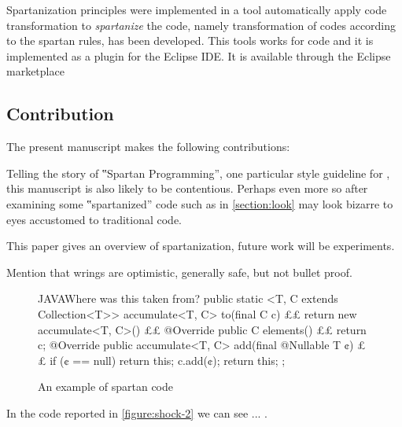 Spartanization principles were implemented in a tool automatically apply code
transformation to \emph{spartanize} the code, namely transformation of codes
according to the spartan rules, has been developed.
This tools works for \Java code and it is implemented as a plugin for the
Eclipse IDE\@. It is available through the Eclipse
marketplace



\subsection{Contribution}

The present manuscript makes the following contributions:

Telling the story of ‟Spartan Programming”, one particular style guideline for
\Java, this manuscript is also likely to be contentious. Perhaps even more so
after examining some ‟spartanized” code such as in \cref{section:look}
may look bizarre to eyes accustomed to traditional \Java code.


This paper gives an overview of spartanization, future work will be
experiments.

Mention that wrings are optimistic, generally safe, but not bullet proof.

\begin{figure}
\label{figure:first}
\caption{An example of spartan code}
\begin{Code}{JAVA}{Where was this taken from?}
public static <T, C extends Collection<T>> accumulate<T, C>
to(final C c) {££
return new accumulate<T, C>() {££
@Override public C elements() {££
return c;
}
@Override public accumulate<T, C>
add(final @Nullable T ¢) {££
if (¢ == null)
return this;
c.add(¢);
return this;
}
};
}
\end{Code}
\end{figure}

In the code reported in \cref{figure:shock-2} we can see ... .

